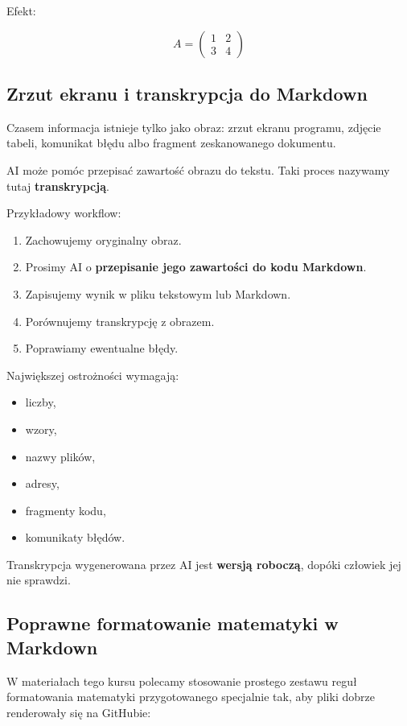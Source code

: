 \documentclass[12pt,a4paper]{article}
\begin{document}
Efekt:

\[
A=
\begin{pmatrix}
1 & 2 \\
3 & 4
\end{pmatrix}
\]

\subsection{Zrzut ekranu i transkrypcja do Markdown}

Czasem informacja istnieje tylko jako obraz: zrzut ekranu programu, zdjęcie tabeli, komunikat błędu albo fragment zeskanowanego dokumentu.

AI może pomóc przepisać zawartość obrazu do tekstu. Taki proces nazywamy tutaj \textbf{transkrypcją}.

Przykładowy workflow:

\begin{enumerate}
    \item Zachowujemy oryginalny obraz.
    \item Prosimy AI o \textbf{przepisanie jego zawartości do kodu Markdown}.
    \item Zapisujemy wynik w pliku tekstowym lub Markdown.
    \item Porównujemy transkrypcję z obrazem.
    \item Poprawiamy ewentualne błędy.
\end{enumerate}

Największej ostrożności wymagają:

\begin{itemize}
    \item liczby,
    \item wzory,
    \item nazwy plików,
    \item adresy,
    \item fragmenty kodu,
    \item komunikaty błędów.
\end{itemize}

Transkrypcja wygenerowana przez AI jest \textbf{wersją roboczą}, dopóki człowiek jej nie sprawdzi.

\subsection{Poprawne formatowanie matematyki w Markdown}

W materiałach tego kursu polecamy stosowanie prostego zestawu reguł formatowania matematyki przygotowanego specjalnie tak, aby pliki dobrze renderowały się na GitHubie:
\end{document}
